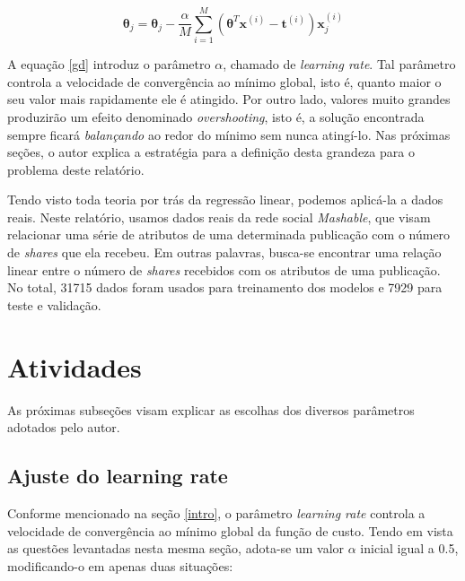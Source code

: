 \documentclass[10pt,twocolumn,letterpaper]{article}
\begin{document}
\begin{equation}
\label {gd}
\bm{\theta}_j = \bm{\theta}_j - \frac{\alpha}{M} \displaystyle\sum_{i=1}^{M} \left(\bm{\theta}^T\bm{x}^{(i)} - \bm{t}^{(i)}\right)\bm{x}_j^{(i)}
\end{equation}

A equação \ref{gd} introduz o parâmetro \(\alpha\), chamado de \textit{learning rate}. Tal parâmetro controla a velocidade de convergência ao mínimo global, isto é, quanto maior o seu valor mais rapidamente ele é atingido. Por outro lado, valores muito grandes produzirão um efeito denominado \textit {overshooting}, isto é, a solução encontrada sempre ficará \textit{balançando} ao redor do mínimo sem nunca atingí-lo. Nas próximas seções, o autor explica a estratégia para a definição desta grandeza para o problema deste relatório.

Tendo visto toda teoria por trás da regressão linear, podemos aplicá-la a dados reais. Neste relatório, usamos dados reais \cite{database} da rede social \textit{Mashable}, que visam relacionar uma série de atributos de uma determinada publicação com o número de \textit{shares} que ela recebeu. Em outras palavras, busca-se encontrar uma relação linear entre o número de \textit{shares} recebidos com os atributos de uma publicação. No total, 31715 dados foram usados para treinamento dos modelos e 7929 para teste e validação.

\section{Atividades}

As próximas subseções visam explicar as escolhas dos diversos parâmetros adotados pelo autor.

\subsection{Ajuste do learning rate}

Conforme mencionado na seção \ref{intro}, o parâmetro \textit{learning rate} controla a velocidade de convergência ao mínimo global da função de custo. Tendo em vista as questões levantadas nesta mesma seção, adota-se um valor \(\alpha\) inicial igual a 0.5, modificando-o em apenas duas situações:
\end{document}
